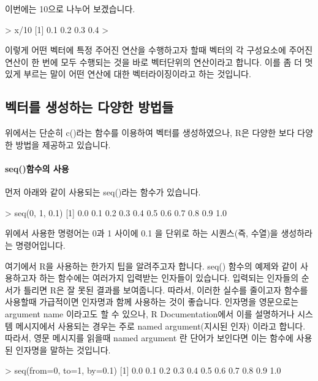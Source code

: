 \documentclass[tutorial.tex]{subfiles}
\begin{document}
이번에는 10으로 나누어 보겠습니다.

\begin{Schunk}
\begin{Soutput}
> x/10
[1] 0.1 0.2 0.3 0.4
> 
\end{Soutput}
\end{Schunk}

이렇게 어떤 벡터에 특정 주어진 연산을 수행하고자 할때 벡터의 각 구성요소에 주어진 연산이 한 번에 모두 수행되는 것을 바로 벡터단위의 연산이라고 합니다. 
이를 좀 더 멋있게 부르는 말이 어떤 연산에 대한 벡터라이징이라고 하는 것입니다. 


\subsection{벡터를 생성하는 다양한 방법들}

위에서는 단순히 c()라는 함수를 이용하여 벡터를 생성하였으나, R은 다양한 보다 다양한 방법을 제공하고 있습니다. 

\paragraph{seq()함수의 사용} 먼저 아래와 같이 사용되는 seq()라는 함수가 있습니다. 

\begin{Schunk}
\begin{Soutput}
> seq(0, 1, 0.1)
 [1] 0.0 0.1 0.2 0.3 0.4 0.5 0.6 0.7 0.8 0.9 1.0
\end{Soutput}
\end{Schunk}

위에서 사용한 명령어는 0과 1 사이에 0.1 을 단위로 하는 시퀀스(즉, 수열)을 생성하라는 명령어입니다. 

여기에서 R을 사용하는 한가지 팁을 알려주고자 합니다.
seq() 함수의 예제와 같이 사용하고자 하는 함수에는 여러가지 입력받는 인자들이 있습니다. 
입력되는 인자들의 순서가 틀리면 R은 잘 못된 결과를 보여줍니다. 
따라서, 이러한 실수를 줄이고자 함수를 사용할때 가급적이면 인자명과 함께 사용하는 것이 좋습니다.  
인자명을 영문으로는 argument name 이라고도 할 수 있으나, R Documentation에서 이를 설명하거나 시스템 메시지에서 사용되는 경우는 주로 named argument(지시된 인자) 이라고 합니다. 
따라서, 영문 메시지를 읽을때 named argument 란 단어가 보인다면 이는 함수에 사용된 인자명을 말하는 것입니다. 

\begin{Schunk}
\begin{Soutput}
> seq(from=0, to=1, by=0.1)
 [1] 0.0 0.1 0.2 0.3 0.4 0.5 0.6 0.7 0.8 0.9 1.0
\end{Soutput}
\end{Schunk}
\end{document}
